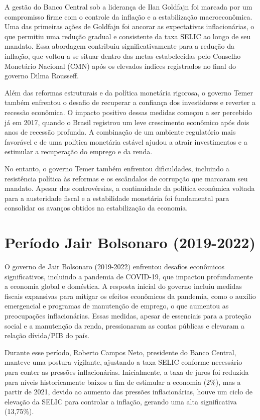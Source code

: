 \documentclass[12pt,oneside,a4paper,chapter=TITLE,english,brazil,sumario=abnt-6027-2012]{abntex2}
\begin{document}
A gestão do Banco Central sob a liderança de Ilan Goldfajn foi marcada por um compromisso firme com o controle da inflação e a estabilização macroeconômica. Uma das primeiras ações de Goldfajn foi ancorar as expectativas inflacionárias, o que permitiu uma redução gradual e consistente da taxa SELIC ao longo de seu mandato. Essa abordagem contribuiu significativamente para a redução da inflação, que voltou a se situar dentro das metas estabelecidas pelo Conselho Monetário Nacional (CMN) após os elevados índices registrados no final do governo Dilma Rousseff.

Além das reformas estruturais e da política monetária rigorosa, o governo Temer também enfrentou o desafio de recuperar a confiança dos investidores e reverter a recessão econômica. O impacto positivo dessas medidas começou a ser percebido já em 2017, quando o Brasil registrou um leve crescimento econômico após dois anos de recessão profunda. A combinação de um ambiente regulatório mais favorável e de uma política monetária estável ajudou a atrair investimentos e a estimular a recuperação do emprego e da renda.

No entanto, o governo Temer também enfrentou dificuldades, incluindo a resistência política às reformas e os escândalos de corrupção que marcaram seu mandato. Apesar das controvérsias, a continuidade da política econômica voltada para a austeridade fiscal e a estabilidade monetária foi fundamental para consolidar os avanços obtidos na estabilização da economia.

\section{Período Jair Bolsonaro (2019-2022)}

O governo de Jair Bolsonaro (2019-2022) enfrentou desafios econômicos significativos, incluindo a pandemia de COVID-19, que impactou profundamente a economia global e doméstica. A resposta inicial do governo incluiu medidas fiscais expansivas para mitigar os efeitos econômicos da pandemia, como o auxílio emergencial e programas de manutenção de emprego, o que aumentou as preocupações inflacionárias. Essas medidas, apesar de essenciais para a proteção social e a manutenção da renda, pressionaram as contas públicas e elevaram a relação dívida/PIB do país.

Durante esse período, Roberto Campos Neto, presidente do Banco Central, manteve uma postura vigilante, ajustando a taxa SELIC conforme necessário para conter as pressões inflacionárias. Inicialmente, a taxa de juros foi reduzida para níveis historicamente baixos a fim de estimular a economia (2\%), mas a partir de 2021, devido ao aumento das pressões inflacionárias, houve um ciclo de elevação da SELIC para controlar a inflação, gerando uma alta significativa (13,75\%).
\end{document}
